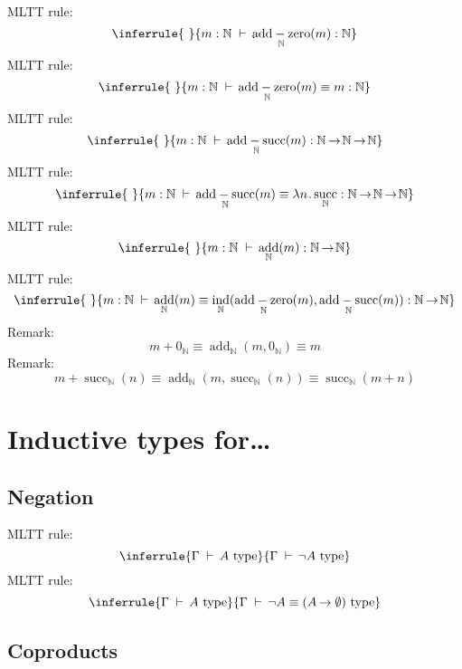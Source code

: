 \documentclass[12pt]{article}
\renewcommand{\.}{\hskip 0.7pt}
\renewcommand{\d}{\;\vdash\,}
\renewcommand{\r}{\!\.\rightarrow\!}
\DeclareMathOperator{\type}{\,type}
\newcommand{\N}{\mathbb{N}}
\DeclareMathOperator{\s}{succ}
\DeclareMathOperator{\ind}{ind}
\DeclareMathOperator{\add}{add}
\DeclareMathOperator{\addz}{add-zero}
\DeclareMathOperator{\adds}{add-succ}
\begin{document}
MLTT rule:
$$\inferrule
{~}
{m : \N \d \addz_\N(m) : \N}
$$
MLTT rule:
$$\inferrule
{~}
{m : \N \d \addz_\N(m) \equiv m : \N}
$$
MLTT rule:
$$\inferrule
{~}
{m : \N \d \adds_\N(m) : \N \r \N \r \N}
$$
MLTT rule:
$$\inferrule
{~}
{m : \N \d \adds_\N(m) \equiv \lambda n \.. \s_\N : \N \r \N \r \N}
$$
MLTT rule:
$$\inferrule
{~}
{m : \N \d \add_\N(m) : \N \r \N}
$$
MLTT rule:
$$\inferrule
{~}
{m : \N \d \add_\N(m) \equiv \ind_\N(\addz_\N(m), \adds_\N(m)) : \N \r \N}
$$
Remark:
$$m + 0_\N \equiv \add_\N(m, 0_\N) \equiv m$$
Remark:
$$m + \s_\N(n) \equiv \add_\N(m, \s_\N(n)) \equiv \s_\N(m+n)$$

\section{Inductive types for\dots}

\subsection{Negation}

MLTT rule:
$$\inferrule
{\Gamma \d A \type}
{\Gamma \d \neg A \type}
$$
MLTT rule:
$$\inferrule
{\Gamma \d A \type}
{\Gamma \d \neg A \equiv (A \r \,\emptyset) \type}
$$

\subsection{Coproducts}
\end{document}
